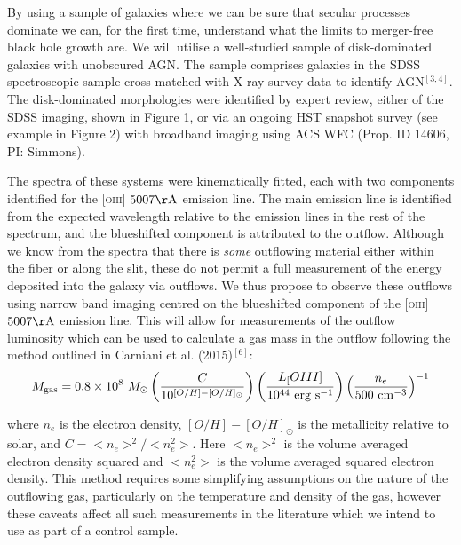 \documentclass[12pt]{article}
\begin{document}
By using a sample of galaxies where we can be sure that secular processes dominate we can, for the first time, understand what the limits to merger-free black hole growth are. We will utilise a well-studied sample of disk-dominated galaxies with unobscured AGN. The sample comprises galaxies in the SDSS spectroscopic sample cross-matched with X-ray survey data to identify AGN$^{[3,4]}$. The disk-dominated morphologies were identified by expert review, either of the SDSS imaging, shown in Figure 1, or via an ongoing HST snapshot survey (see example in Figure 2) with broadband imaging using ACS WFC (Prop. ID 14606, PI: Simmons). 
\vspace{0.25em}

The spectra of these systems were kinematically fitted, each with two components identified for the \textsc{[oiii]} $5007\rm{\AA}$ emission line. The main emission line is identified from the expected wavelength relative to the emission lines in the rest of the spectrum, and the blueshifted component is attributed to the outflow. Although we know from the spectra that there is \emph{some} outflowing material either within the fiber or along the slit, these do not permit a full measurement of the energy deposited into the galaxy via outflows. We thus propose to observe these outflows using narrow band imaging centred on the blueshifted component of the \textsc{[oiii]} $5007\rm{\AA}$ emission line. This will allow for measurements of the outflow luminosity which can be used to calculate a gas mass in the outflow following the method outlined in Carniani et al. (2015)$^{[6]}$:
\begin{equation}
M_{\rm{gas}} = 0.8 \times 10^8~M_{\odot} \left( \frac{C}{10^{[O/H] - [O/H]_{\odot}}} \right) \left( \frac{L_[OIII]}{10^{44}~\rm{erg}~\rm{s}^{-1}} \right) \left( \frac{n_e}{500~\rm{cm}^{-3}} \right)^{-1}
\end{equation}

where $n_e$ is the electron density, $[O/H] - [O/H]_{\odot}$ is the metallicity relative to solar, and $C = <n_e>^2 / <n_e^2>$. Here $<n_e>^2$ is the volume averaged electron density squared and $<n_e^2>$ is the volume averaged squared electron density. This method requires some simplifying assumptions on the nature of the outflowing gas, particularly on the temperature and density of the gas, however these caveats affect all such measurements in the literature which we intend to use as part of a control sample. 
\vspace{0.25em}
\end{document}
